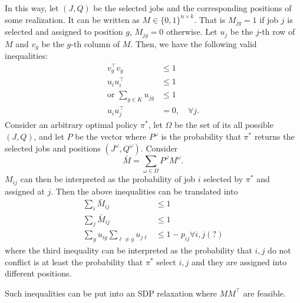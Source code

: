 \documentclass{article}
\begin{document}
In this way, let $(J, Q)$ be the selected jobs and the corresponding positions of some realization.
It can be written as $M\in\{0,1\}^{n\times k}$.
That is $M_{jg} = 1$ if job $j$ is selected and assigned to position $g$, $M_{jg}=0$ otherwise.
Let $u_j$ be the $j$-th row of $M$ and $v_g$ be the $g$-th column of $M$.
Then, we have the following valid inequalities:
\begin{align*}
    v_g^\top v_g&\leq 1\\
    u_iu_i^\top&\leq 1\\
    \text{or }\sum_{g\in K}u_{jg}&\leq 1\\
        u_iu_j^\top&=0,\quad \forall j.
\end{align*}
Consider an arbitrary optimal policy $\pi^*$, let $\Omega$ be the set of its all possible $(J,Q)$, and let $P$ be the vector where $P^\omega$ is the probability that $\pi^*$ returns the selected jobs and positions $(J^\omega,Q^\omega)$.
Consider
\[\bar{M}=\sum_{\omega\in\Omega}P^\omega M^\omega.\]
$M_{ij}$ can then be interpreted as the probability of job $i$ selected by $\pi^*$ and assigned at $j$. Then the above inequalities can be translated into
\begin{align*}
    \sum_{i}\bar{M}_{ij}&\leq 1\\
    \sum_{j}\bar{M}_{ij}&\leq 1\\
    \sum_{g}u_{ig}\sum_{\ell\neq g}u_{j\ell}&\leq 1-p_{ij} \forall i,j(?)
\end{align*}
where the third inequality can be interpreted as the probability that $i,j$ do not conflict is at least the probability that $\pi^*$ select $i,j$ and they are assigned into different positions.

Such inequalities can be put into an SDP relaxation where $MM^\top$ are feasible.
\end{document}
